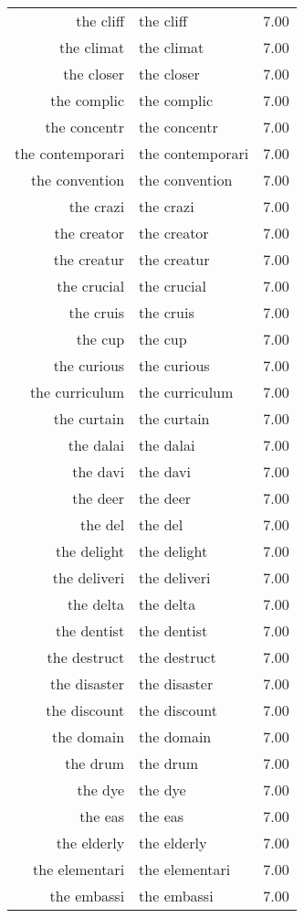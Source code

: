 \begin{table}[ht]
\begin{tabular}{rlr}
  the cliff & the cliff & 7.00 \\ 
  the climat & the climat & 7.00 \\ 
  the closer & the closer & 7.00 \\ 
  the complic & the complic & 7.00 \\ 
  the concentr & the concentr & 7.00 \\ 
  the contemporari & the contemporari & 7.00 \\ 
  the convention & the convention & 7.00 \\ 
  the crazi & the crazi & 7.00 \\ 
  the creator & the creator & 7.00 \\ 
  the creatur & the creatur & 7.00 \\ 
  the crucial & the crucial & 7.00 \\ 
  the cruis & the cruis & 7.00 \\ 
  the cup & the cup & 7.00 \\ 
  the curious & the curious & 7.00 \\ 
  the curriculum & the curriculum & 7.00 \\ 
  the curtain & the curtain & 7.00 \\ 
  the dalai & the dalai & 7.00 \\ 
  the davi & the davi & 7.00 \\ 
  the deer & the deer & 7.00 \\ 
  the del & the del & 7.00 \\ 
  the delight & the delight & 7.00 \\ 
  the deliveri & the deliveri & 7.00 \\ 
  the delta & the delta & 7.00 \\ 
  the dentist & the dentist & 7.00 \\ 
  the destruct & the destruct & 7.00 \\ 
  the disaster & the disaster & 7.00 \\ 
  the discount & the discount & 7.00 \\ 
  the domain & the domain & 7.00 \\ 
  the drum & the drum & 7.00 \\ 
  the dye & the dye & 7.00 \\ 
  the eas & the eas & 7.00 \\ 
  the elderly & the elderly & 7.00 \\ 
  the elementari & the elementari & 7.00 \\ 
  the embassi & the embassi & 7.00 \\ 

\end{tabular}
\end{table}
